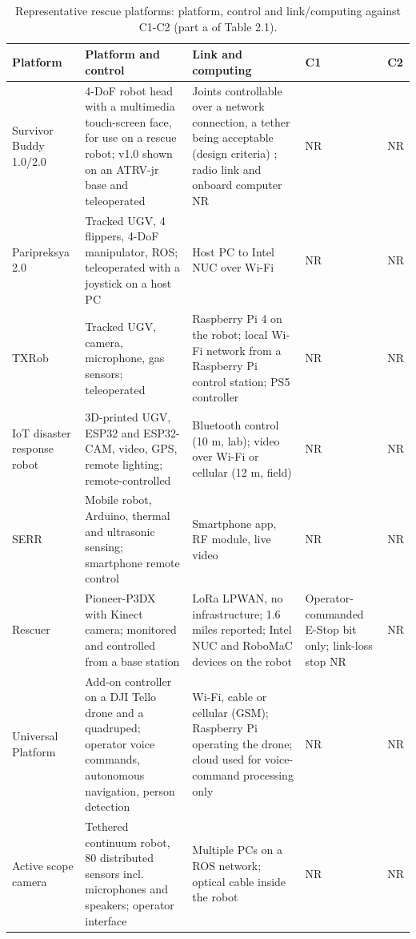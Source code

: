 \begin{center}
\scriptsize
\setlength{\tabcolsep}{3pt}
\begin{longtable}{|p{2.0cm}|p{3.3cm}|p{3.3cm}|p{2.6cm}|p{2.6cm}|}
\caption{Representative rescue platforms: platform, control and link/computing against C1-C2 (part a of Table 2.1).}\\
\hline
\textbf{Platform} & \textbf{Platform and control} & \textbf{Link and computing} & \textbf{C1} & \textbf{C2} \\
\hline
\endhead
Survivor Buddy 1.0/2.0 \cite{murphy2010,murphy2011} & 4-DoF robot head with a multimedia touch-screen face, for use on a rescue robot; v1.0 shown on an ATRV-jr base and teleoperated & Joints controllable over a network connection, a tether being acceptable (design criteria) \cite{murphy2011}; radio link and onboard computer NR & NR & NR \\
\hline
Paripreksya 2.0 \cite{megalingam2022} & Tracked UGV, 4 flippers, 4-DoF manipulator, ROS; teleoperated with a joystick on a host PC & Host PC to Intel NUC over Wi-Fi & NR & NR \\
\hline
TXRob \cite{verano2022} & Tracked UGV, camera, microphone, gas sensors; teleoperated & Raspberry Pi 4 on the robot; local Wi-Fi network from a Raspberry Pi control station; PS5 controller & NR & NR \\
\hline
IoT disaster response robot \cite{pramono2024} & 3D-printed UGV, ESP32 and ESP32-CAM, video, GPS, remote lighting; remote-controlled & Bluetooth control (10 m, lab); video over Wi-Fi or cellular (12 m, field) & NR & NR \\
\hline
SERR \cite{khattab2025} & Mobile robot, Arduino, thermal and ultrasonic sensing; smartphone remote control & Smartphone app, RF module, live video & NR & NR \\
\hline
Rescuer \cite{manuel2022} & Pioneer-P3DX with Kinect camera; monitored and controlled from a base station & LoRa LPWAN, no infrastructure; 1.6 miles reported; Intel NUC and RoboMaC devices on the robot & Operator-commanded E-Stop bit only; link-loss stop NR & NR \\
\hline
Universal Platform \cite{cafolla2026} & Add-on controller on a DJI Tello drone and a quadruped; operator voice commands, autonomous navigation, person detection & Wi-Fi, cable or cellular (GSM); Raspberry Pi operating the drone; cloud used for voice-command processing only & NR & NR \\
\hline
Active scope camera \cite{yamauchi2022} & Tethered continuum robot, 80 distributed sensors incl. microphones and speakers; operator interface & Multiple PCs on a ROS network; optical cable inside the robot & NR & NR \\

\end{longtable}
\end{center}

